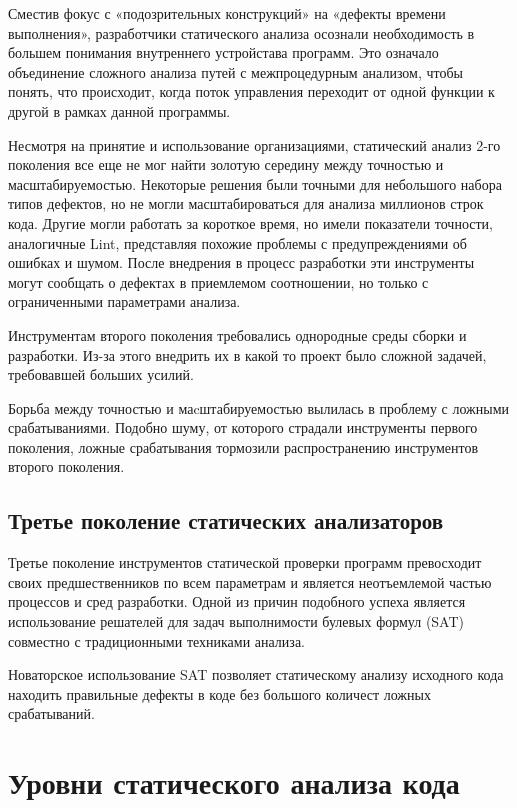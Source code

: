 Сместив фокус с «подозрительных конструкций» на «дефекты времени выполнения», разработчики 
статического анализа осознали необходимость в большем понимания внутреннего 
устройстава программ. Это означало объединение сложного анализа путей с межпроцедурным анализом, 
чтобы понять, что происходит, когда поток управления переходит от одной функции к другой в 
рамках данной программы.

Несмотря на принятие и использование организациями, статический анализ 2-го поколения все еще 
не мог найти золотую середину между точностью и масштабируемостью. Некоторые решения были 
точными для небольшого набора типов дефектов, но не могли масштабироваться для анализа 
миллионов строк кода. Другие могли работать за короткое время, но имели показатели точности, 
аналогичные Lint, представляя похожие проблемы с предупреждениями об ошибках и шумом. После 
внедрения в процесс разработки эти инструменты могут сообщать о дефектах в приемлемом 
соотношении, но только с ограниченными параметрами анализа. 

Инструментам второго поколения требовались однородные среды сборки и разработки. 
Из-за этого внедрить их в какой то проект было сложной задачей, требовавшей больших усилий.

Борьба между точностью и маcштабируемостью вылилась в проблему с ложными срабатываниями. Подобно 
шуму, от которого страдали инструменты первого поколения, ложные срабатывания тормозили 
распространению инструментов второго поколения. 

\subsection{Третье поколение статических анализаторов}
Третье поколение инструментов статической проверки программ превосходит своих предшественников по
всем параметрам и является неотъемлемой частью процессов и сред разработки. Одной из причин подобного успеха является использование решателей для
задач выполнимости булевых формул (SAT) совместно с традиционными техниками анализа.\cite{}

Новаторское использование SAT позволяет статическому анализу исходного кода находить правильные дефекты 
в коде без большого количест ложных срабатываний.

\section{Уровни статического анализа кода}

